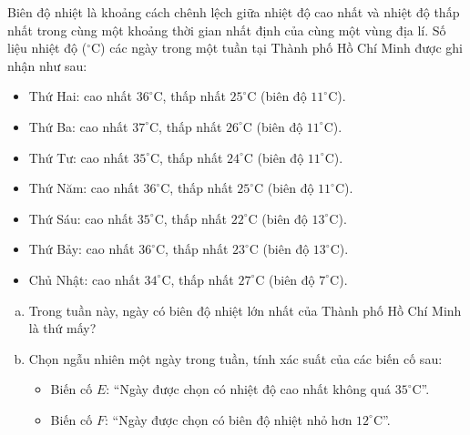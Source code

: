\begin{bt}%
Biên độ nhiệt là khoảng cách chênh lệch giữa nhiệt độ cao nhất và nhiệt độ thấp nhất trong cùng một khoảng thời gian nhất định của cùng một vùng địa lí. Số liệu nhiệt độ ($^\circ\text{C}$) các ngày trong một tuần tại Thành phố Hồ Chí Minh được ghi nhận như sau:
\begin{itemize}
	\item Thứ Hai: cao nhất $36^\circ\text{C}$, thấp nhất $25^\circ\text{C}$ (biên độ $11^\circ\text{C}$).
	\item Thứ Ba: cao nhất $37^\circ\text{C}$, thấp nhất $26^\circ\text{C}$ (biên độ $11^\circ\text{C}$).
	\item Thứ Tư: cao nhất $35^\circ\text{C}$, thấp nhất $24^\circ\text{C}$ (biên độ $11^\circ\text{C}$).
	\item Thứ Năm: cao nhất $36^\circ\text{C}$, thấp nhất $25^\circ\text{C}$ (biên độ $11^\circ\text{C}$).
	\item Thứ Sáu: cao nhất $35^\circ\text{C}$, thấp nhất $22^\circ\text{C}$ (biên độ $13^\circ\text{C}$).
	\item Thứ Bảy: cao nhất $36^\circ\text{C}$, thấp nhất $23^\circ\text{C}$ (biên độ $13^\circ\text{C}$).
	\item Chủ Nhật: cao nhất $34^\circ\text{C}$, thấp nhất $27^\circ\text{C}$ (biên độ $7^\circ\text{C}$).
\end{itemize}
\begin{enumerate}[a)]
	\item Trong tuần này, ngày có biên độ nhiệt lớn nhất của Thành phố Hồ Chí Minh là thứ mấy?
	\item Chọn ngẫu nhiên một ngày trong tuần, tính xác suất của các biến cố sau:
	\begin{itemize}
		\item Biến cố $E$: ``Ngày được chọn có nhiệt độ cao nhất không quá $35^\circ\text{C}$''.
		\item Biến cố $F$: ``Ngày được chọn có biên độ nhiệt nhỏ hơn $12^\circ\text{C}$''.
	\end{itemize}
\end{enumerate}
\end{bt}
